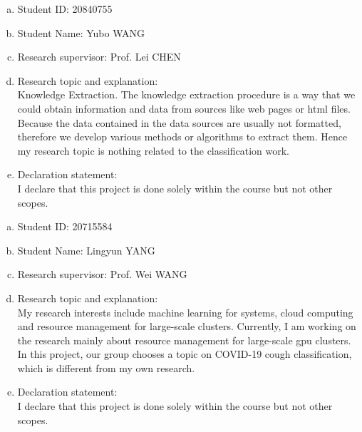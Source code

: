 \documentclass[11pt]{article}
\begin{document}
\begin{member}
	\begin{enumerate}[(a)]
		\item Student ID: 20840755
		\item Student Name: Yubo WANG
		\item Research supervisor: Prof. Lei CHEN
		\item Research topic and explanation: \\
		Knowledge Extraction. The knowledge extraction procedure is a way that we could obtain information and data from sources like web pages or html files. Because the data contained in the data sources are usually not formatted, therefore we develop various methods or algorithms to extract them. Hence my research topic is nothing related to the classification work.
		\item Declaration statement: \\
		I declare that this project is done solely within the course but not other scopes. 
	\end{enumerate}
\end{member}

\begin{member}
	\begin{enumerate}[(a)]
		\item Student ID: 20715584
		\item Student Name: Lingyun YANG
		\item Research supervisor: Prof. Wei WANG
		\item Research topic and explanation: \\
		My research interests include machine learning for systems, cloud computing and resource management for large-scale clusters. Currently, I am working on the research mainly about resource management for large-scale gpu clusters. In this project, our group chooses a topic on COVID-19 cough classification, which is different from my own research.
		\item Declaration statement: \\
		I declare that this project is done solely within the course but not other scopes.

	\end{enumerate}
\end{member}

\end{document}
